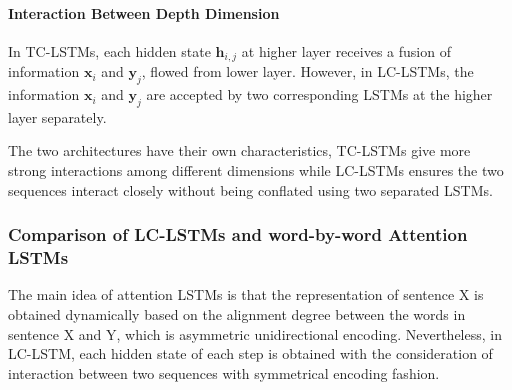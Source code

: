 \documentclass{article}
\begin{document}
\paragraph{Interaction Between Depth Dimension}
In TC-LSTMs, each hidden state $\mathbf{h}_{i,j}$ at higher layer receives a fusion of information $\mathbf{x}_i$ and $\mathbf{y}_j$, flowed from lower layer. However, in LC-LSTMs, the information $\mathbf{x}_i$ and $\mathbf{y}_j$ are accepted by two corresponding LSTMs at the higher layer separately.

The two architectures have their own characteristics, TC-LSTMs give more strong interactions among different dimensions while LC-LSTMs ensures the two sequences interact closely without being conflated using two separated LSTMs.

\subsubsection{Comparison of LC-LSTMs and word-by-word Attention LSTMs}
The main idea of attention LSTMs is that the representation of sentence X is obtained dynamically based on the alignment degree between the words in sentence X and Y, which is asymmetric unidirectional encoding.
Nevertheless, in LC-LSTM, each hidden state of  each step  is obtained with the consideration of interaction between two sequences with symmetrical encoding fashion.

%
%
%
\end{document}
